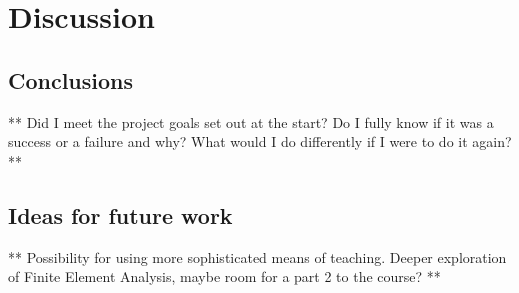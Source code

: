 \chapter{Discussion}
\label{chapter4}


\section{Conclusions}

** Did I meet the project goals set out at the start? Do I fully know if it was a success or a failure and why? What would I do differently if I were to do it again? **

\section{Ideas for future work}

** Possibility for using more sophisticated means of teaching. Deeper exploration of Finite Element Analysis, maybe room for a part 2 to the course? **